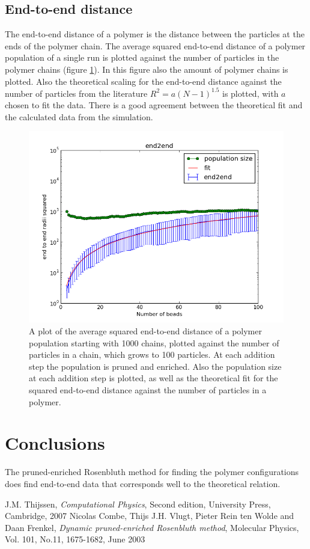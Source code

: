 \documentclass{article}
\begin{document}
\begin{multicols}{2}
\subsection*{End-to-end distance}
The end-to-end distance of a polymer is the distance between the particles at the ends of the polymer chain. The average squared end-to-end distance of a polymer population of a single run is plotted against the number of particles in the polymer chains (figure \ref{fig:end2end}). In this figure also the amount of polymer chains is plotted. Also the theoretical scaling for the end-to-end distance against the number of particles from the literature $R^2=a(N-1)^{1.5}$ \cite{Jos}  is plotted, with $a$ chosen to fit the data. There is a good agreement between the theoretical fit and the calculated data from the simulation.
 \begin{figure}[ht]
\centering
\includegraphics[width=\textwidth]{betereplot.png}
\caption{A plot of the average squared end-to-end distance of a polymer population starting with 1000 chains, plotted against the number of particles in a chain, which grows to 100 particles. At each addition step the population is pruned and enriched. Also the population size at each addition step is plotted, as well as the theoretical fit for the squared end-to-end distance against the number of particles in a polymer. }
 \label{fig:end2end}
\end{figure} 
\section*{Conclusions}
The pruned-enriched Rosenbluth method  for finding the polymer configurations does find end-to-end data that corresponds well to the theoretical relation.
\begin{thebibliography}{9}
 J.M. Thijssen,\emph{ Computational Physics}, Second edition, University Press, Cambridge, 2007
 Nicolas Combe, Thijs J.H. Vlugt, Pieter Rein ten Wolde and Daan Frenkel, \emph{Dynamic pruned-enriched Rosenbluth method}, Molecular Physics, Vol. 101, No.11, 1675-1682, June 2003
\end{thebibliography}


\end{multicols}
\end{document}

